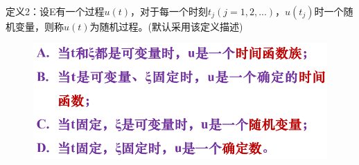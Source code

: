 \documentclass[UTF8]{ctexart} %
\begin{document}
				定义2：设E有一个过程$u(t)$，对于每一个时刻$t_j(j=1,2,...)$，$u(t_j)$时一个随机变量，则称$u(t)$为随机过程。(默认采用该定义描述)
				\begin{figure}[H]
					\centering\includegraphics[scale=0.35]{3.png}
				\end{figure}
			
\end{document}
